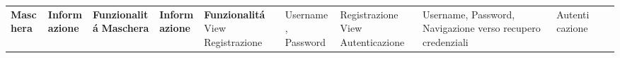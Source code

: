 \begin{center}




    \begin{adjustwidth}{-1.9cm}{0cm}
        \begin{longtable}
            {|>{\raggedright}m{3.5cm}|>{\raggedright}m{7.5cm}|>{\raggedright}m{3cm}|}
            \hline
            \n      {}
            \large \centering\textbf{Maschera}          & \centering\large\textbf{Informazione}                                                                                                                                                                                                                                                                                                                                                         & \large\textbf{Funzionalitá}
            \endfirsthead
            \hline      {}
            \large \centering\textbf{Maschera}          & \centering\large\textbf{Informazione}                                                                                                                                                                                                                                                                                                                                                         & \large\textbf{Funzionalitá}
            \endhead
            \hline  View Registrazione                  & Username, Password                                                                                                                                                                                                                                                                                                                                                                            & Registrazione
            \n      View Autenticazione                 & Username, Password, Navigazione verso recupero credenziali                                                                                                                                                                                                                                                                                                                                       & Autenticazione

\end{longtable}
\end{adjustwidth}
\end{center}
